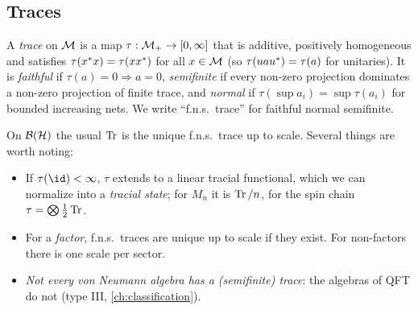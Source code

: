 \subsection{Traces}

\begin{definition}
A \emph{trace} on $\mathcal{M}$ is a map $\tau:\mathcal{M}_+\to[0,\infty]$ that is additive, positively homogeneous and satisfies $\tau(x^{*} x)=\tau(xx^{*})$ for all $x\in\mathcal{M}$ (so $\tau(uau^{*})=\tau(a)$ for unitaries). It is \emph{faithful} if $\tau(a)=0\Rightarrow a=0$, \emph{semifinite} if every non-zero projection dominates a non-zero projection of finite trace, and \emph{normal} if $\tau(\sup a_i)=\sup\tau(a_i)$ for bounded increasing nets. We write ``f.n.s.\ trace'' for faithful normal semifinite.
\end{definition}

On $\mathcal{B}(\mathcal{H})$ the usual $\operatorname{Tr}$ is the unique f.n.s.\ trace up to scale. Several things are worth noting:
\begin{itemize}
\item If $\tau(\id)<\infty$, $\tau$ extends to a linear tracial functional, which we can normalize into a \emph{tracial state}; for $M_n$ it is $\operatorname{Tr}/n$, for the spin chain $\tau=\bigotimes\frac12\operatorname{Tr}$.
\item For a \emph{factor}, f.n.s.\ traces are unique up to scale if they exist. For non-factors there is one scale per sector.
\item \emph{Not every von Neumann algebra has a (semifinite) trace}: the algebras of QFT do not (type III, \cref{ch:classification}).
\end{itemize}

